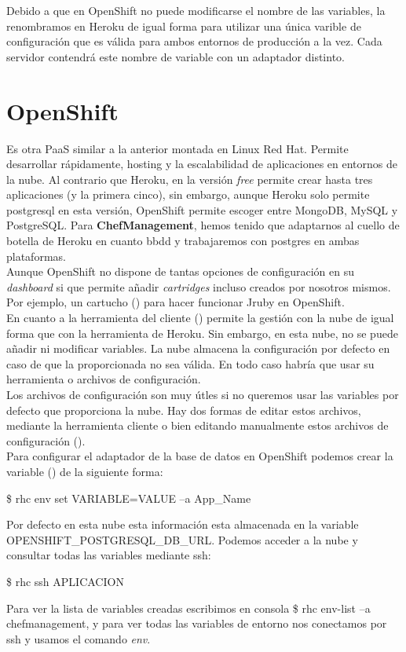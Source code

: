 Debido a que en OpenShift no puede modificarse el nombre de las variables, la renombramos en Heroku de igual forma para utilizar una única varible de configuración que es válida para ambos entornos de producción a la vez. Cada servidor contendrá este nombre de variable con un adaptador distinto.


\vspace*{0.2in}
\section{OpenShift}\label{cap.3.3}
Es otra PaaS similar a la anterior montada en Linux Red Hat. Permite desarrollar rápidamente, hosting y la escalabilidad de aplicaciones en entornos de la nube. Al contrario que Heroku, en la versión \emph{free} permite crear hasta tres aplicaciones (y la primera cinco), sin embargo, aunque Heroku solo permite postgresql en esta versión, OpenShift permite escoger entre MongoDB, MySQL y PostgreSQL. Para \textbf{ChefManagement}, hemos tenido que adaptarnos al cuello de botella de Heroku en cuanto bbdd y trabajaremos con postgres en ambas plataformas. \\

Aunque OpenShift no dispone de tantas opciones de configuración en su \emph{dashboard} si que permite añadir \emph{cartridges} incluso creados por nosotros mismos. Por ejemplo, un cartucho (\cite{URL:Cartucho_JRuby}) para hacer funcionar Jruby en OpenShift. \\

En cuanto a la herramienta del cliente (\cite{URL:OpenshiftTool}) permite la gestión con la nube de igual forma que con la herramienta de Heroku. Sin embargo, en esta nube, no se puede añadir ni modificar variables. La nube almacena la configuración por defecto en caso de que la proporcionada no sea válida. En todo caso habría que usar su herramienta o archivos de configuración. \\

Los archivos de configuración son muy útles si no queremos usar las variables por defecto que proporciona la nube. Hay dos formas de editar estos archivos, mediante la herramienta cliente o bien editando manualmente estos archivos de configuración (\cite{URL:Openshift_configuracion_archivos}). \\

Para configurar el adaptador de la base de datos en OpenShift podemos crear la variable (\cite{URL:Openshift_vars}) de la siguiente forma:
\begin{center}
	\$ rhc env set VARIABLE=VALUE --a App\_Name
\end{center}

Por defecto en esta nube esta información esta almacenada en la variable OPENSHIFT\_POSTGRESQL\_DB\_URL. Podemos acceder a la nube y consultar todas las variables mediante ssh:
\begin{center}
\$ rhc ssh APLICACION
\end{center}

Para ver la lista de variables creadas escribimos en consola \$ rhc env-list --a chefmanagement, y para ver todas las variables de entorno nos conectamos por ssh y usamos el comando \emph{env}.
